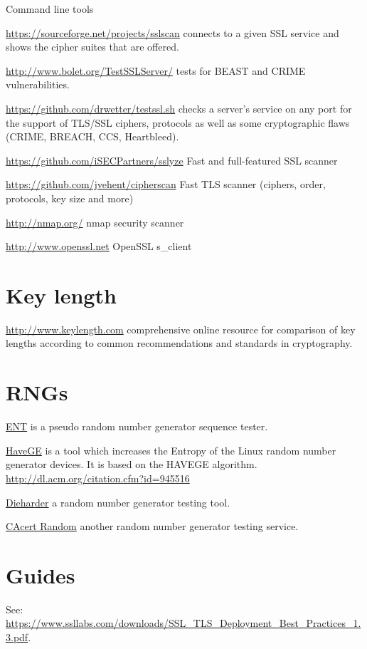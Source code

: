Command line tools
\begin{itemize*}
  \item \url{https://sourceforge.net/projects/sslscan} connects to a given SSL service and shows the cipher suites that are offered.
  \item \url{http://www.bolet.org/TestSSLServer/} tests for BEAST and CRIME vulnerabilities.
  \item \url{https://github.com/drwetter/testssl.sh} checks a server's service on any port for the support of TLS/SSL ciphers, protocols as well as some cryptographic flaws (CRIME, BREACH, CCS, Heartbleed).
  \item \url{https://github.com/iSECPartners/sslyze} Fast and full-featured SSL scanner
  \item \url{https://github.com/jvehent/cipherscan} Fast TLS scanner (ciphers, order, protocols, key size and more)
  \item \url{http://nmap.org/} nmap security scanner
  \item \url{http://www.openssl.net} OpenSSL s\_client
\end{itemize*}


\section{Key length}
\begin{itemize*}
  \item \url{http://www.keylength.com} comprehensive online resource for comparison of key lengths according to common recommendations and standards in cryptography.
\end{itemize*}


\section{RNGs}

\begin{itemize*}
  \item \href{http://www.fourmilab.ch/random/}{ENT} is a pseudo random number generator sequence tester.
  \item \href{http://www.issihosts.com/haveged/}{HaveGE} is a tool which increases the Entropy of the Linux random number generator devices. It is based on the HAVEGE algorithm. \url{http://dl.acm.org/citation.cfm?id=945516}
  \item \href{http://www.phy.duke.edu/~rgb/General/dieharder.php}{Dieharder} a random number generator testing tool.
  \item \href{http://www.cacert.at/random/}{CAcert Random} another random number generator testing service.
\end{itemize*}

\section{Guides}
\begin{itemize*}
  \item See: \url{https://www.ssllabs.com/downloads/SSL_TLS_Deployment_Best_Practices_1.3.pdf}.
\end{itemize*}
